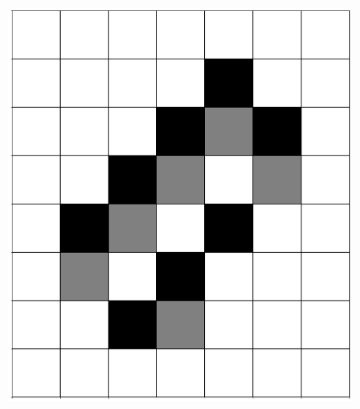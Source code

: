 \documentclass[12pt]{article}
\numberwithin{figure}{section} %
\begin{document}
\begin{figure}[H]
\begin{subfigure}{0.19\textwidth}
     \includegraphics[width=\linewidth]{Section4/21.2}
     \subcaption{}
   \end{subfigure}
           \begin{subfigure}{0.19\textwidth}
     \centering

\end{subfigure}
\end{figure}
\end{document}
